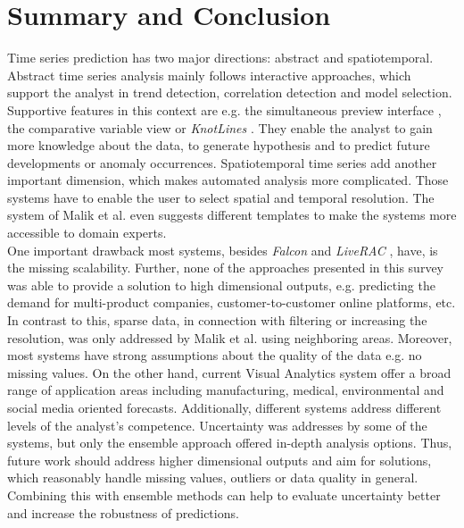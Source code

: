 \documentclass[electronic]{vgtc}             %
\begin{document}
\section{Summary and Conclusion}
Time series prediction has two major directions: abstract and spatiotemporal.
Abstract time series analysis mainly follows interactive approaches, which
support the analyst in trend detection, correlation detection and model selection. 
Supportive features in this context are e.g. the simultaneous preview interface \cite{buono:2007}, the comparative variable view \cite{steed:2017} or \textit{KnotLines}  \cite{Xie:2014}.
They enable the analyst to gain more knowledge about the data, to generate hypothesis and to predict future developments or anomaly occurrences.
Spatiotemporal time series add another important dimension, which makes automated analysis more complicated. 
Those systems have to enable the user to select spatial and temporal resolution.
The system of Malik et al. \cite{malik:2014} even suggests different templates to make the systems more accessible to domain experts.\\
One important drawback most systems, besides \textit{Falcon}  \cite{steed:2017} and \textit{LiveRAC} \cite{McLachlan:2008}, have, is the missing scalability. 
Further, none of the approaches presented in this survey was able to provide a solution to high dimensional outputs, e.g. predicting the demand for multi-product companies, customer-to-customer online platforms, etc.
In contrast to this, sparse data, in connection with filtering or increasing the resolution, was only addressed by Malik et al. \cite{malik:2014} using neighboring areas.
Moreover, most systems have strong assumptions about the quality of the data e.g. no missing values.
On the other hand, current Visual Analytics system offer a broad range of application areas including manufacturing, medical, environmental and social media oriented forecasts.
Additionally, different systems address different levels of the analyst's competence.
Uncertainty was addresses by some of the systems, but only the ensemble approach \cite{koepp:2014} offered in-depth analysis options.
Thus, future work should address higher dimensional outputs and aim for solutions, which reasonably handle missing values, outliers or data quality in general.
Combining this with ensemble methods can help to evaluate uncertainty better and increase the robustness of predictions.

%
%
%

%


\end{document}
